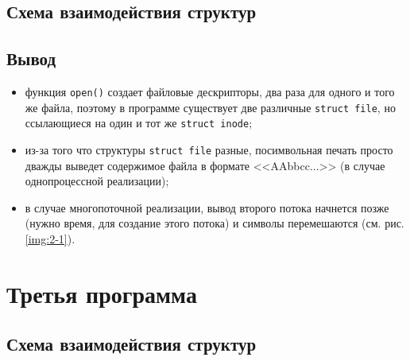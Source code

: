 

\newpage



\newpage

\subsection{Схема взаимодействия структур}


\subsection*{Вывод}

\begin{itemize}
	\item функция \texttt{open()} создает файловые дескрипторы, два раза для одного и того же файла, поэтому в программе существует две различные \texttt{struct file}, но ссылающиеся на один и тот же \texttt{struct inode};
	\item из-за того что структуры \texttt{struct file} разные, посимвольная печать просто дважды выведет содержимое файла в формате <<AAbbcc...>> (в случае однопроцессной реализации); 
	\item в случае многопоточной реализации, вывод второго потока начнется позже (нужно время, для создание этого потока) и символы перемешаются (см. рис. \ref{img:2-1}).
\end{itemize}

\newpage

\section{Третья программа}

\subsection{Схема взаимодействия структур}

